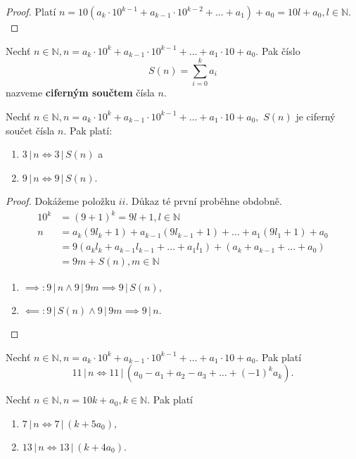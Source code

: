 \begin{proof}
Platí $n = 10(a_k\cdot 10^{k-1}+a_{k-1}\cdot 10 ^{k-2}+\dots+a_1)+a_0 = 10l+a_0, l\in \mathbb N.$
\end{proof}

\begin{definition}
  Nechť $n\in \mathbb N, n=a_k\cdot 10^k+a_{k-1}\cdot 10^{k-1}+\dots + a_1\cdot 10 + a_0.$ Pak číslo
  $$S(n) = \sum_{i=0}^k a_i$$
  nazveme \textbf{ciferným součtem} čísla $n$.
\end{definition}

\begin{veta}
  Nechť $n\in \mathbb N, n=a_k\cdot 10^k+a_{k-1}\cdot 10^{k-1}+\dots + a_1\cdot 10 + a_0,$ $S(n)$ je ciferný součet čísla $n$. Pak platí:
  \begin{enumerate}[$i.$]
    \item $3\, | \, n \iff 3 \, | \, S(n)$ a
    \item $9\, | \, n \iff 9 \, | \, S(n)$.
  \end{enumerate}
\end{veta}

\begin{proof}
  Dokážeme položku $ii$. Důkaz té první proběhne obdobně.
  \begin{align*}
    10^k & = (9+1)^k = 9l+1, l \in \mathbb N \\
    n & = a_k(9l_k+1)+a_{k-1}(9l_{k-1}+1)+\dots + a_1(9l_1+1)+a_0 \\
      & = 9(a_kl_k+a_{k-1}l_{k-1}+\dots+a_1l_1)+(a_k+a_{k-1}+\dots+a_0) \\
      & = 9m+S(n), m \in \mathbb N
  \end{align*}
  \begin{enumerate}
    \item $\implies: 9 \, | \, n \land 9 \, | \, 9m \implies 9 \, | \, S(n)$,
    \item $\impliedby: 9 \, | \, S(n) \land 9 \, | \, 9m \implies 9 \, | \, n.$ \qedhere
  \end{enumerate}
\end{proof}

\begin{veta}
  Nechť $n\in \mathbb N, n=a_k\cdot 10^k + a_{k-1}\cdot 10^{k-1}+\dots+a_1\cdot 10+ a_0$. Pak platí
  \[
    11 \, | \, n \iff 11 \, | \, (a_0-a_1+a_2-a_3+\dots+(-1)^k a_k).
  \]
\end{veta}

\begin{veta}
  Nechť $n\in \mathbb N, n=10k+a_0,k\in \mathbb N.$ Pak platí
  \begin{enumerate}[$i.$]
    \item $7 \, | \, n \iff 7 \, | \, (k+5a_0),$
    \item $13 \, | \, n \iff 13 \, | \, (k+4a_0) $.
  \end{enumerate}
\end{veta}

